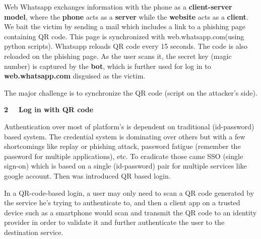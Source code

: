 \documentclass[12pt]{report}
\renewcommand{\_}{\kern-1.5pt\textunderscore\kern-1.5pt}
\begin{document}
\begin{FlushLeft}
Web Whatsapp exchanges information with the phone as a \textbf{client-server model}, where the \textbf{phone} acts as a \textbf{server} while the \textbf{website }acts\textbf{ }as a \textbf{client}. We bait the victim by sending a mail which includes a link to a phishing page containing QR code. This page is synchronized with web.whatsapp.com(using python scripts). Whatsapp reloads QR code every 15 seconds. The code is also reloaded on the phishing page. As the user scans it, the secret key (magic number) is captured by the \textbf{bot}, which is further used for log in to \textbf{web.whatsapp.com} disguised as the victim. 
\end{FlushLeft}\par

\begin{FlushLeft}
The major challenge is to synchronize the QR code (script on the attacker’s side).
\end{FlushLeft}\par


\vspace{\baselineskip}
\begin{FlushLeft}
{\fontsize{18pt}{21.6pt}\selectfont \textbf{2}\ \ \  \textbf{Log in with QR code}\par}
\end{FlushLeft}\par

\begin{FlushLeft}
Authentication over most of platform’s is dependent on traditional (id-password) based system. The credential system is dominating over others but with a few shortcomings like replay or phishing attack, password fatigue (remember the password for multiple applications), etc. To eradicate those came SSO (single sign-on) which is based on a single (id-password) pair for multiple services like google account. Then was introduced QR based login.
\end{FlushLeft}\par

\begin{FlushLeft}
\textcolor[HTML]{24292E}{In a QR-code-based login, a user may only need to scan a QR code generated by the service he’s trying to authenticate to, and then a client app on a trusted device such as a smartphone would scan and transmit the QR code to an identity provider in order to validate it and further authenticate the user to the destination service. }
\end{FlushLeft}\par
\end{document}
